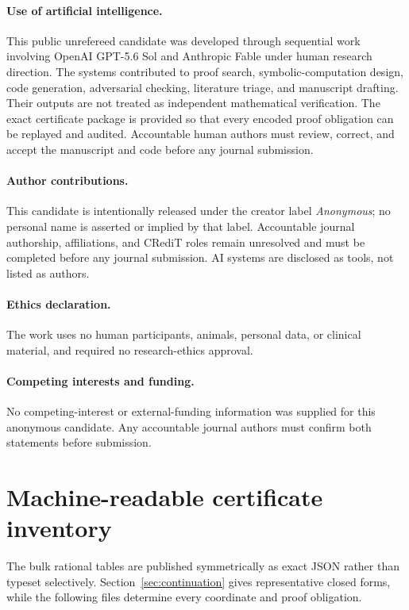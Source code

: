 \documentclass[11pt]{article}
\begin{document}
\paragraph{Use of artificial intelligence.}
This public unrefereed candidate was developed through sequential work involving OpenAI GPT-5.6 Sol and Anthropic Fable under human research direction.  The systems contributed to proof search, symbolic-computation design, code generation, adversarial checking, literature triage, and manuscript drafting.  Their outputs are not treated as independent mathematical verification.  The exact certificate package is provided so that every encoded proof obligation can be replayed and audited.  Accountable human authors must review, correct, and accept the manuscript and code before any journal submission.

\paragraph{Author contributions.}
This candidate is intentionally released under the creator label
\emph{Anonymous}; no personal name is asserted or implied by that label.
Accountable journal authorship, affiliations, and CRediT roles remain
unresolved and must be completed before any journal submission.  AI systems
are disclosed as tools, not listed as authors.

\paragraph{Ethics declaration.}
The work uses no human participants, animals, personal data, or clinical material, and required no research-ethics approval.

\paragraph{Competing interests and funding.}
No competing-interest or external-funding information was supplied for this anonymous candidate.  Any accountable journal authors must confirm both statements before submission.

\appendix

\section{Machine-readable certificate inventory}\label{app:inventory}

The bulk rational tables are published symmetrically as exact JSON rather than
typeset selectively.  Section~\ref{sec:continuation} gives representative
closed forms, while the following files determine every coordinate and proof
obligation.
\end{document}
